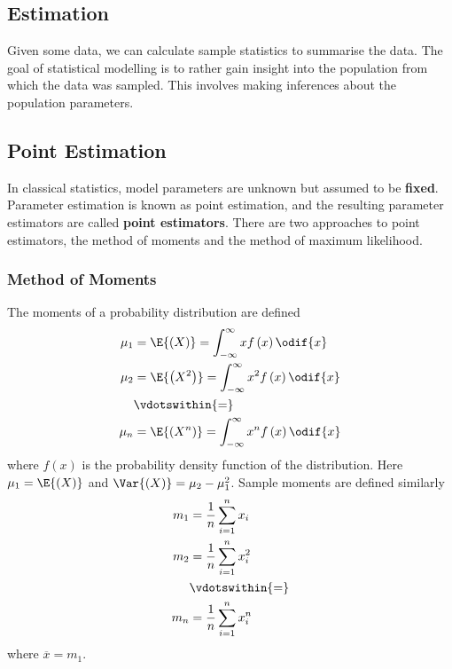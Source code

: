 \documentclass{article}
\begin{document}
\subsection{Estimation}
Given some data, we can calculate sample statistics to summarise the
data. The goal of statistical modelling is to rather gain insight into
the population from which the data was sampled. This involves making
inferences about the population parameters.
\subsection{Point Estimation}
In classical statistics, model parameters are unknown but assumed to be
\textbf{fixed}. Parameter \linebreak estimation is known as point
estimation, and the resulting parameter estimators are called
\textbf{point estimators}. There are two approaches to point
estimators, the method of moments and the method of maximum likelihood.
\subsubsection{Method of Moments}
The moments of a probability distribution are defined
\begin{align*}
    \mu_1 & = \E{\left( X \right)} = \int_{-\infty}^\infty x f\left( x \right) \odif{x}     \\
    \mu_2 & = \E{\left( X^2 \right)} = \int_{-\infty}^\infty x^2 f\left( x \right) \odif{x} \\
          & \vdotswithin{=}                                                                 \\
    \mu_n & = \E{\left( X^n \right)} = \int_{-\infty}^\infty x^n f\left( x \right) \odif{x}
\end{align*}
where \(f\left( x \right)\) is the probability density function of the distribution.
Here \(\mu_1 = \E{\left( X \right)}\) and \(\Var{\left( X \right)} = \mu_2 - \mu_1^2\).
Sample moments are defined similarly
\begin{align*}
    m_1 & = \frac{1}{n} \sum_{i = 1}^n x_i   \\
    m_2 & = \frac{1}{n} \sum_{i = 1}^n x_i^2 \\
        & \vdotswithin{=}                    \\
    m_n & = \frac{1}{n} \sum_{i = 1}^n x_i^n
\end{align*}
where \(\overline{x} = m_1\).
\end{document}
